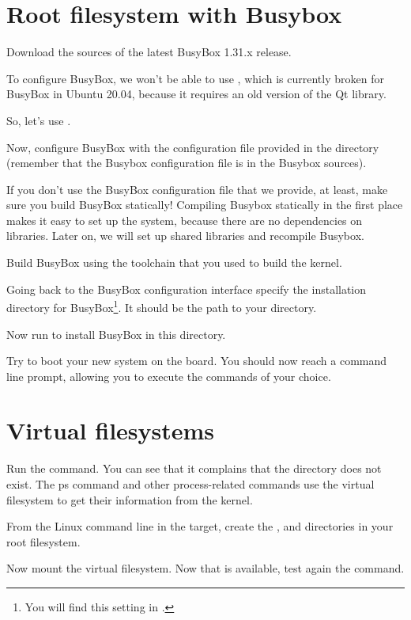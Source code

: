 \section{Root filesystem with Busybox}

Download the sources of the latest BusyBox 1.31.x release.

To configure BusyBox, we won't be able to use ,
which is currently broken for BusyBox in Ubuntu 20.04,
because it requires an old version of the Qt library.

So, let's use .

Now, configure BusyBox with the configuration file provided in the
 directory (remember that the Busybox configuration file
is  in the Busybox sources).

If you don't use the BusyBox configuration file that we provide, at least,
make sure you build BusyBox statically! Compiling Busybox
statically in the first place makes it easy to set up the system,
because there are no dependencies on libraries. Later on, we will set
up shared libraries and recompile Busybox.

Build BusyBox using the toolchain that you used to build the kernel.

Going back to the BusyBox configuration interface
specify the installation directory for BusyBox\footnote{You will find
this setting in .}.
It should be the path to your  directory.

Now run  to install BusyBox in this directory.

Try to boot your new system on the board. You should now reach a
command line prompt, allowing you to execute the commands of your
choice.

\section{Virtual filesystems}

Run the  command. You can see that it complains that the
 directory does not exist. The ps command and other
process-related commands use the  virtual filesystem to get
their information from the kernel.

From the Linux command line in the target, create the ,
 and  directories in your root filesystem.

Now mount the  virtual filesystem. Now that  is
available, test again the  command.

